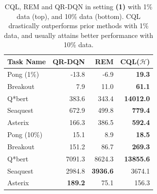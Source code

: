 \begin{table}
\captionsetup{font=small}
    \centering
    \fontsize{8}{8}\selectfont
    \begin{tabular}{l|r|r||r}
    \hline
        \textbf{Task Name} & \textbf{QR-DQN} & \textbf{REM} & \textbf{CQL($\mathcal{H}$)} \\
        \hline
         Pong (1\%) & -13.8 & -6.9 & \textbf{19.3} \\
         Breakout & 7.9 & 11.0 & \textbf{61.1} \\
         Q*bert & 383.6 & 343.4 & \textbf{14012.0} \\
         Seaquest & 672.9 & 499.8 & \textbf{779.4} \\
         Asterix  & 166.3 & 386.5 & \textbf{592.4}\\
         \hline
         \hline
         Pong (10\%) & 15.1 & 8.9 & \textbf{18.5} \\
         Breakout & 151.2 & 86.7 & \textbf{269.3} \\
         Q*bert & 7091.3 & 8624.3 & \textbf{13855.6}\\
         Seaquest & 2984.8 & \textbf{3936.6} & 3674.1 \\
         Asterix & \textbf{189.2} & 75.1 & 156.3 \\
         \hline
    \end{tabular}
    \caption{{CQL, REM and QR-DQN in setting \textbf{(1)} with 1\% data (top), and 10\% data (bottom). CQL drastically outperforms prior methods with 1\% data, and usually attains better performance with 10\% data.}}
    \normalsize
    \label{table:atari_reduced_size}
\end{table}

